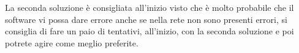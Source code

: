 \begin{center}
\end{center}

La seconda soluzione è consigliata all'inizio visto che è molto probabile che il software vi possa dare errore anche se nella rete non sono presenti errori, si consiglia di fare un paio di tentativi, all’inizio, con la seconda soluzione e poi potrete agire come meglio preferite.
